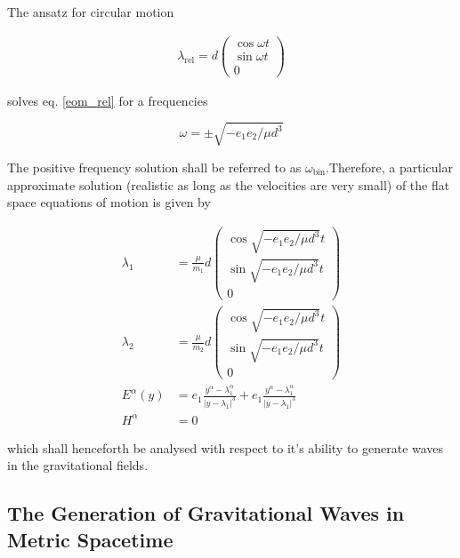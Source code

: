 \documentclass[11pt]{article}
\begin{document}
The ansatz for circular motion

\begin{align}
	\lambda_{\text{rel}}  
	= d\begin{pmatrix}
	\cos{\omega t}\\ \sin{\omega t}\\ 0
	\end{pmatrix}
\end{align}

solves eq. \ref{eom_rel} for a frequencies

 \begin{equation}
 	 \omega = \pm \sqrt{- e_1 e_2 / \mu d^3} \label{freq_bin}
 \end{equation}
 
The positive frequency solution shall be referred to as $\omega_{\text{bin}}$.Therefore, a particular approximate solution (realistic as long as the velocities are very small) of the flat space equations of motion is given by

\begin{align}
	\lambda_1 &= \frac{\mu}{m_1}
	d\begin{pmatrix}
	\cos{\sqrt{- e_1 e_2 / \mu d^3} t}\\ \sin{\sqrt{- e_1 e_2 / \mu d^3} t}\\ 0
	\end{pmatrix}\\
	\lambda_2 &= \frac{\mu}{m_2}
	d\begin{pmatrix}
	\cos{\sqrt{- e_1 e_2 / \mu d^3} t}\\ \sin{\sqrt{- e_1 e_2 / \mu d^3} t}\\ 0
	\end{pmatrix}\\
	E^\alpha \left( y \right) &= 
	e_1 \frac{y^\alpha - \lambda_1^\alpha }{\left| y - \lambda_1\right|^3} 
	+ e_1 \frac{y^\alpha - \lambda_1^\alpha }{\left| y - \lambda_1\right|^3} 
	\label{E_bin}\\
	H^\alpha &= 0 \label{H_bin}
\end{align}

which shall henceforth be analysed with respect to it's ability to generate waves in the gravitational fields.


\subsection{The Generation of Gravitational Waves in Metric Spacetime}
\end{document}
